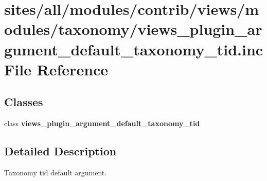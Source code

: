\hypertarget{views__plugin__argument__default__taxonomy__tid_8inc}{
\section{sites/all/modules/contrib/views/modules/taxonomy/views\_\-plugin\_\-argument\_\-default\_\-taxonomy\_\-tid.inc File Reference}
\label{views__plugin__argument__default__taxonomy__tid_8inc}
}
\subsection*{Classes}
\begin{CompactItemize}
\item 
class \textbf{views\_\-plugin\_\-argument\_\-default\_\-taxonomy\_\-tid}
\end{CompactItemize}


\subsection{Detailed Description}
Taxonomy tid default argument. 